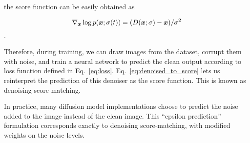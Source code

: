 the score function can be easily obtained as
    
\begin{equation}
    \nabla_{\boldsymbol{x}} \log p(\boldsymbol{x}; \sigma(t)) = (D(\boldsymbol{x};\sigma) - \boldsymbol{x})/\sigma^2 \label{eq:denoised_to_score}
\end{equation}.

Therefore, during training, we can draw images from the dataset, corrupt them with noise, and train a neural network to predict the clean output according to loss function defined in Eq.~\ref{eq:loss}. Eq.~\ref{eq:denoised_to_score} lets us reinterpret the prediction of this denoiser as the score function. This is known as denoising score-matching.

In practice, many diffusion model implementations choose to predict the noise added to the image instead of the clean image. This ``epsilon prediction'' formulation corresponds exactly to denoising score-matching, with modified weights on the noise levels.

